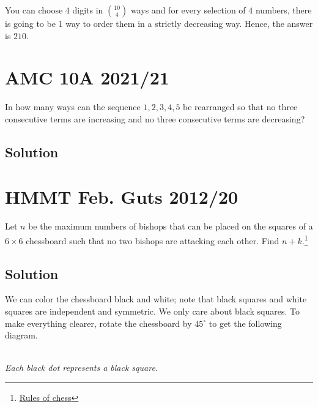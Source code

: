 \documentclass[mast]{lucky}
\begin{document}
You can choose $4$ digits in $\binom{10}{4}$ ways and for every selection of $4$ numbers, there is going to be 1 way to order them in a strictly decreasing way. Hence, the answer is $210.$

\pagebreak\section{AMC 10A 2021/21}

In how many ways can the sequence $1, 2, 3, 4, 5$ be rearranged so that no three consecutive terms are increasing and no three consecutive terms are decreasing?

\subsection{Solution}

\pagebreak\section{HMMT Feb. Guts 2012/20}

Let $n$ be the maximum numbers of bishops that can be placed on the squares of a $6\times 6$ chessboard such that no two bishops are attacking each other. Find $n+k.$\footnote{\href{https://www.ichess.net/blog/chess-pieces-moves/}{Rules of chess}}

\subsection{Solution}

We can color the chessboard black and white; note that black squares and white squares are independent and symmetric. We only care about black squares. To make everything clearer, rotate the chessboard by $45^{\circ}$ to get the following diagram.

\begin{center}
\\[\baselineskip]
\textit{Each black dot represents a black square.}
\end{center}
\end{document}
